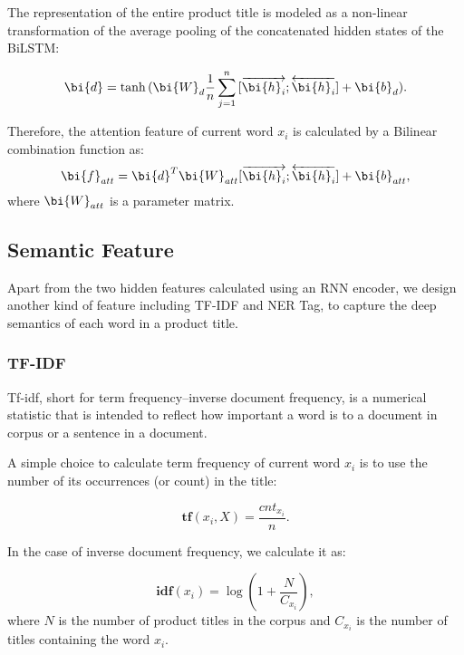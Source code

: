 The representation of the entire product title is modeled as a non-linear transformation of the average pooling of the concatenated hidden states of the BiLSTM:

\begin{equation}
\bi{d}=\tanh{(\bi{W}_d{\frac{1}{n}}\sum_{j=1}^{n}{[\overrightarrow{\bi{h}_i};\overleftarrow{\bi{h}_i}]}+\bi{b}_d)}.
\end{equation}

Therefore, the attention feature of current word $x_i$ is calculated by a Bilinear combination function as:
\begin{equation}
\label{eqn:attention}
\bi{f}_{att} = \bi{d}^T\bi{W}_{att} [\overrightarrow{\bi{h}_i};\overleftarrow{\bi{h}_i}] + \bi{b}_{att},
\end{equation}
where $\bi{W}_{att}$ is a parameter matrix.

\subsection{Semantic Feature}

Apart from the two hidden features calculated using an RNN encoder, 
we design another kind of feature including TF-IDF and NER Tag, 
to capture the deep semantics of each word in a product title.

\subsubsection{TF-IDF}

Tf-idf, short for term frequency–inverse document frequency, 
is a numerical statistic that is intended to reflect how important a word is to a document in corpus or a sentence in a document.

A simple choice to calculate term frequency of current word $x_i$ is to use the 
number of its occurrences (or count) in the title:

\begin{equation}
\label{eqn:tf}
\textbf{tf}(x_i, X) =\frac{cnt_{x_i}}{n}.
\end{equation}

In the case of inverse document frequency, we calculate it as:

\begin{equation}
\label{eqn:idf}
\textbf{idf}(x_i) =\log(1+\frac{N}{C_{x_i}}),
\end{equation}
where $N$ is the number of product titles in the corpus and $C_{x_i}$ is the number of titles containing the word $x_i$.

